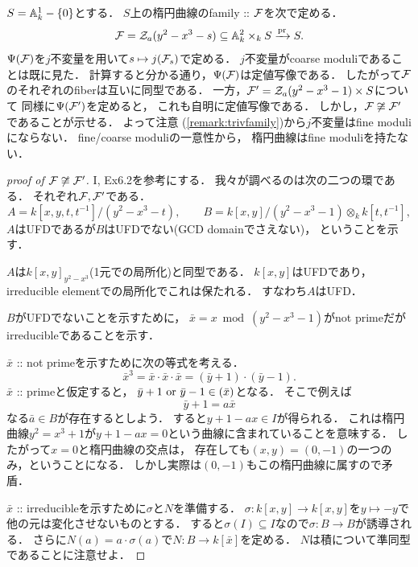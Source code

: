 \documentclass[a4paper]{jsarticle}
\begin{document}
    $S=\mathbb{A}^1_k-\{0\}$とする．
    $S$上の楕円曲線のfamily :: $\mathcal{F}$を次で定める．
    \[
        \mathcal{F}=\mathcal{Z}_a(y^2-x^3-s) \subseteq \mathbb{A}^2_k \times_k S
        \xrightarrow{\operatorname{pr}} S.
    \]
    $\Psi(\mathcal{F})$を$j$不変量を用いて$s \mapsto j(\mathcal{F}_s)$で定める．
    $j$不変量がcoarse moduliであることは既に見た．
    計算すると分かる通り，$\Psi(\mathcal{F})$は定値写像である．
    したがって$\mathcal{F}$のそれぞれのfiberは互いに同型である．
    一方，$\mathcal{F}'=\mathcal{Z}_a(y^2-x^3-1) \times S$について
    同様に$\Psi(\mathcal{F}')$を定めると，
    これも自明に定値写像である．
    しかし，$\mathcal{F} \not \cong \mathcal{F}'$であることが示せる．
    よって注意 (\ref{remark:trivfamily})から$j$不変量はfine moduliにならない．
    fine/coarse moduliの一意性から，
    楕円曲線はfine moduliを持たない．
    \begin{proof}[proof of $\mathcal{F} \not \cong \mathcal{F}'$]
        \cite{HarAG} I, Ex6.2を参考にする．
        我々が調べるのは次の二つの環である．
        それぞれ$\mathcal{F}, \mathcal{F}'$である．
        \[
            A=k[x,y, t,t^{-1}]/(y^2-x^3-t),
            \qquad
            B=k[x,y]/(y^2-x^3-1) \otimes_k k[t,t^{-1}],
        \]
        $A$はUFDであるが$B$はUFDでない(GCD domainでさえない)，
        ということを示す．

        $A$は$k[x,y]_{y^2-x^3}$(1元での局所化)と同型である．
        $k[x,y]$はUFDであり，irreducible elementでの局所化でこれは保たれる．
        すなわち$A$はUFD．

        $B$がUFDでないことを示すために，
        $\bar{x}=x \bmod (y^2-x^3-1)$がnot primeだがirreducibleであることを示す．

        $\bar{x}$ :: not primeを示すために次の等式を考える．
        \[ \bar{x}^3=\bar{x} \cdot \bar{x} \cdot \bar{x}=(\bar{y}+1) \cdot (\bar{y}-1). \]
        $\bar{x}$ :: primeと仮定すると，
        $\bar{y}+1 \text{ or } \bar{y}-1 \in (\bar{x})$となる．
        そこで例えば
        \[ \bar{y}+1=a \bar{x} \]
        なる$\bar{a} \in B$が存在するとしよう．
        すると$y+1-a x \in I$が得られる．
        これは楕円曲線$y^2=x^3+1$が$y+1-a x=0$という曲線に含まれていることを意味する．
        したがって$x=0$と楕円曲線の交点は，
        存在しても$(x,y)=(0,-1)$の一つのみ，ということになる．
        しかし実際は$(0,-1)$もこの楕円曲線に属すので矛盾．

        $\bar{x}$ :: irreducibleを示すために$\sigma$と$N$を準備する．
        $\sigma: k[x,y] \to k[x,y]$を$y \mapsto -y$で他の元は変化させないものとする．
        すると$\sigma(I) \subseteq I$なので$\sigma: B \to B$が誘導される．
        さらに$N(a)=a \cdot \sigma(a)$で$N: B \to k[\bar{x}]$を定める．
        $N$は積について準同型であることに注意せよ．


\end{proof}
\end{document}
